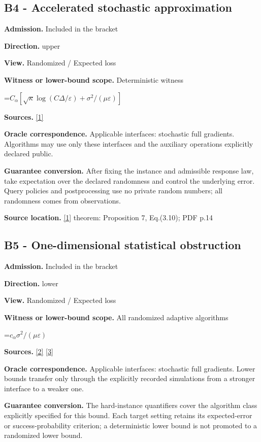 \documentclass[10pt,a4paper]{article}
\newcommand{\AtlasMath}[1]{\par\begingroup\centering\setbox0=\hbox{$\displaystyle #1$}\ifdim\wd0>1.4\linewidth\typeout{ATLAS WIDE FORMULA: \the\wd0}\fi\ifdim\wd0>\linewidth\resizebox{\linewidth}{!}{\box0}\else\box0\fi\par\endgroup}
\begin{document}
\subsection{B4 - Accelerated stochastic approximation}
\textbf{Admission.} Included in the bracket

\textbf{Direction.} upper

\textbf{View.} Randomized / Expected loss

\textbf{Witness or lower-bound scope.} Deterministic witness

\AtlasMath{C_\alpha[\sqrt\kappa\log(C\Delta/\varepsilon)+\sigma^2/(\mu\varepsilon)]}
\textbf{Sources.} \href{https://optimization-online.org/wp-content/uploads/2012/06/3508.pdf}{[1]}

\textbf{Oracle correspondence.} Applicable interfaces: stochastic full gradients. Algorithms may use only these interfaces and the auxiliary operations explicitly declared public.

\textbf{Guarantee conversion.} After fixing the instance and admissible response law, take expectation over the declared randomness and control the underlying error. Query policies and postprocessing use no private random numbers; all randomness comes from observations.

\textbf{Source location.} \href{https://optimization-online.org/wp-content/uploads/2012/06/3508.pdf}{[1]} theorem: Proposition 7, Eq.(3.10); PDF p.14

\subsection{B5 - One-dimensional statistical obstruction}
\textbf{Admission.} Included in the bracket

\textbf{Direction.} lower

\textbf{View.} Randomized / Expected loss

\textbf{Witness or lower-bound scope.} All randomized adaptive algorithms

\AtlasMath{c_\alpha \sigma^2/(\mu\varepsilon)}
\textbf{Sources.} \href{https://arxiv.org/pdf/2609.10874}{[2]} \href{https://proceedings.mlr.press/v202/sadiev23a/sadiev23a.pdf}{[3]}

\textbf{Oracle correspondence.} Applicable interfaces: stochastic full gradients. Lower bounds transfer only through the explicitly recorded simulations from a stronger interface to a weaker one.

\textbf{Guarantee conversion.} The hard-instance quantifiers cover the algorithm class explicitly specified for this bound. Each target setting retains its expected-error or success-probability criterion; a deterministic lower bound is not promoted to a randomized lower bound.
\end{document}
